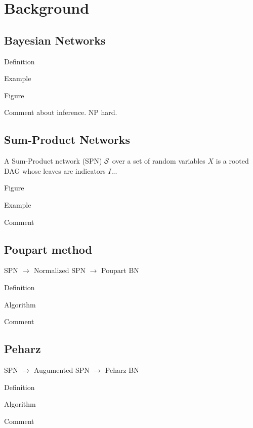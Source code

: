 \section{Background}


\subsection{Bayesian Networks}

Definition

Example

Figure

Comment about inference. NP hard.

\subsection{Sum-Product Networks}

A Sum-Product network (SPN) $\cal S$ over a set of random variables $X$ is a rooted DAG whose leaves are indicators $I$...

Figure

Example

Comment


\subsection{Poupart method}

SPN $\rightarrow$ Normalized SPN $\rightarrow$ Poupart BN

Definition

Algorithm

Comment

\subsection{Peharz}

SPN $\rightarrow$ Augumented SPN $\rightarrow$ Peharz BN

Definition

Algorithm

Comment
